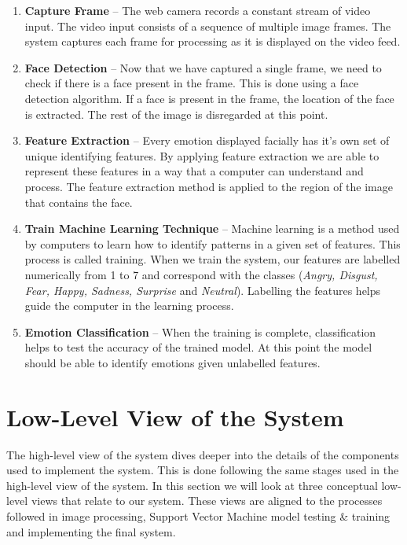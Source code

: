 \begin{enumerate}
  \item \textbf{Capture Frame} -- The web camera records a constant stream of video input. The video input consists of a sequence of multiple image frames. The system captures each frame for processing as it is displayed on the video feed.

  \item \textbf{Face Detection} -- Now that we have captured a single frame, we need to check if there is a face present in the frame. This is done using a face detection algorithm. If a face is present in the frame, the location of the face is extracted. The rest of the image is disregarded at this point.

  \item \textbf{Feature Extraction} -- Every emotion displayed facially has it's own set of unique identifying features. By applying feature extraction we are able to represent these features in a way that a computer can understand and process. The feature extraction method is applied to the region of the image that contains the face.

  \item \textbf{Train Machine Learning Technique} -- Machine learning is a method used by computers to learn how to identify patterns in a given set of features. This process is called training. When we train the system, our features are labelled numerically from 1 to 7 and correspond with the classes (\textit{Angry, Disgust, Fear, Happy, Sadness, Surprise} and \textit{Neutral}). Labelling the features helps guide the computer in the learning process.

  \item \textbf{Emotion Classification} -- When the training is complete, classification helps to test the accuracy of the trained model. At this point the model should be able to identify emotions given unlabelled features.
\end{enumerate}

\clearpage
\section{Low-Level View of the System}\label{sec:lowlevel}
The high-level view of the system dives deeper into the details of the components used to implement the system. This is done following the same stages used in the high-level view of the system. In this section we will look at three conceptual low-level views that relate to our system. These views are aligned to the processes followed in image processing, Support Vector Machine model testing \& training and implementing the final system.
